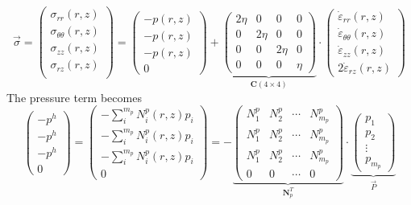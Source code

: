 \[
\vec{\sigma}=
\left(
\begin{array}{c}
\sigma_{rr}(r,z) \\
\sigma_{\theta\theta}(r,z) \\
\sigma_{zz}(r,z) \\
\sigma_{rz}(r,z) \\
\end{array}
\right)
=
\left(
\begin{array}{c}
-p(r,z) \\ -p(r,z) \\ -p(r,z) \\ 0
\end{array}
\right)+
\underbrace{
\left(
\begin{array}{cccc}
2\eta & 0 & 0 & 0  \\
0& 2\eta & 0& 0  \\
0 & 0 & 2\eta & 0  \\
0 & 0 & 0 & \eta
\end{array}
\right)
}_{{\bm C}(4 \times 4)}
\cdot
\left(
\begin{array}{c}
\dot\varepsilon_{rr}(r,z) \\
\dot\varepsilon_{\theta\theta}(r,z) \\
\dot\varepsilon_{zz}(r,z) \\
2\dot\varepsilon_{rz}(r,z) 
\end{array}
\right)
\]
The pressure term becomes
\[
\left(
\begin{array}{c}
-p^h \\ -p^h \\ -p^h \\ 0
\end{array}
\right)
=
\left(
\begin{array}{c}
-\sum\limits_i^{m_p} N_i^p(r,z) p_i \\
-\sum\limits_i^{m_p} N_i^p(r,z) p_i \\ 
-\sum\limits_i^{m_p} N_i^p(r,z) p_i \\ 
0
\end{array}
\right)
=
-
\underbrace{
\left(
\begin{array}{cccc}
N_1^p & N_2^p & \cdots & N_{m_p}^p \\
N_1^p & N_2^p & \cdots & N_{m_p}^p \\
N_1^p & N_2^p & \cdots & N_{m_p}^p \\
0 & 0 & \cdots & 0
\end{array}
\right)
}_{{\bm N}_p^T}
\cdot
\underbrace{
\left(
\begin{array}{c}
p_1 \\ p_2 \\ \vdots \\ p_{m_p}
\end{array}
\right)
}_{\vec{P}}
\]
